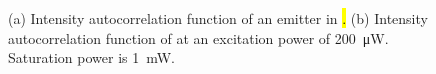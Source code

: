 		\begin{figure}[!htb]
			\begin{subfigure}[tp]{ 0.49\linewidth}
				\centering
				\caption{}\label{subfig::g2_a}
			\end{subfigure}
			\hfill
			\begin{subfigure}[tp]{ 0.49\linewidth}
				\centering
				\caption{}\label{subfig::g2_b}
			\end{subfigure}
			\caption[Intensity autocorrelation measurements for \hl and \vl]{(a) Intensity autocorrelation function of an emitter in \hl. (b) Intensity autocorrelation function of \embroad at an excitation power of \SIlist{200}{\micro\W}. Saturation power is \SI{1}{mW}.}
			\label{fig::g2}
		\end{figure}

